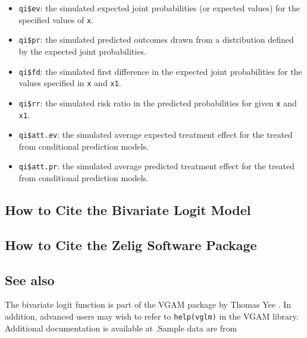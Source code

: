 \begin{itemize}
   \begin{itemize}
   \item {\tt qi\$ev}: the simulated expected joint probabilities (or expected
     values) for the specified values of {\tt x}.  
   \item {\tt qi\$pr}: the simulated predicted outcomes drawn from a
     distribution defined by the expected joint probabilities.
   \item {\tt qi\$fd}: the simulated first difference in the
     expected joint probabilities for the values specified in {\tt x} and
     {\tt x1}.
   \item {\tt qi\$rr}: the simulated risk ratio in the predicted
     probabilities for given {\tt x} and {\tt x1}.
   \item {\tt qi\$att.ev}: the simulated average expected treatment
     effect for the treated from conditional prediction models.  
   \item {\tt qi\$att.pr}: the simulated average predicted treatment
     effect for the treated from conditional prediction models.  
   \end{itemize}
\end{itemize}

\subsection*{How to Cite the Bivariate Logit Model}

\subsection*{How to Cite the Zelig Software Package}
\CiteZelig


\subsection*{See also}
The bivariate logit function is part of the VGAM package by Thomas Yee \citep{YeeHas03}. In addition, advanced users may wish to refer to \texttt{help(vglm)} 
in the VGAM library.  Additional documentation is available at
.Sample data are from \cite{Martin92}




 